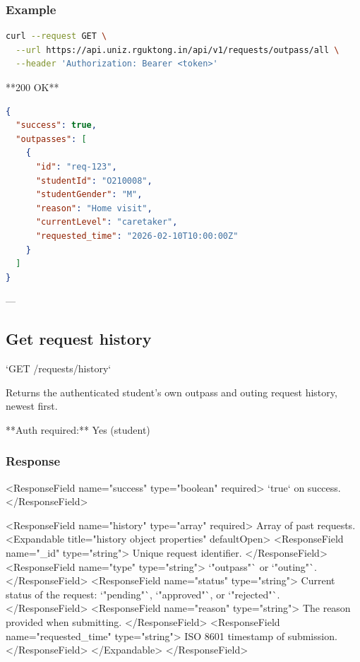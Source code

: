 \subsubsection{Example}

\begin{lstlisting}[language=bash]
curl --request GET \
  --url https://api.uniz.rguktong.in/api/v1/requests/outpass/all \
  --header 'Authorization: Bearer <token>'

\end{lstlisting}

**200 OK**

\begin{lstlisting}[language=json]
{
  "success": true,
  "outpasses": [
    {
      "id": "req-123",
      "studentId": "O210008",
      "studentGender": "M",
      "reason": "Home visit",
      "currentLevel": "caretaker",
      "requested_time": "2026-02-10T10:00:00Z"
    }
  ]
}

\end{lstlisting}

---

\subsection{Get request history}

`GET /requests/history`

Returns the authenticated student's own outpass and outing request history, newest first.

**Auth required:** Yes (student)

\subsubsection{Response}

<ResponseField name="success" type="boolean" required>
  `true` on success.
</ResponseField>

<ResponseField name="history" type="array" required>
  Array of past requests.
  <Expandable title="history object properties" defaultOpen>
    <ResponseField name="_id" type="string">
      Unique request identifier.
    </ResponseField>
    <ResponseField name="type" type="string">
      `"outpass"` or `"outing"`.
    </ResponseField>
    <ResponseField name="status" type="string">
      Current status of the request: `"pending"`, `"approved"`, or `"rejected"`.
    </ResponseField>
    <ResponseField name="reason" type="string">
      The reason provided when submitting.
    </ResponseField>
    <ResponseField name="requested_time" type="string">
      ISO 8601 timestamp of submission.
    </ResponseField>
  </Expandable>
</ResponseField>


